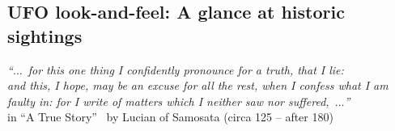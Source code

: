 %
%
%

\begin{partbacktext}
\part{UFO look-and-feel: A glance at historic sightings}
\noindent

\begin{flushright}
{\em ``$\ldots$~for this one thing I confidently pronounce for a truth, that I lie:\\
and this, I hope, may be an excuse for all the rest, when I confess what I am faulty in:
for I write of matters which I neither saw nor suffered,~$\ldots$''} \\
in ``A True Story''~\cite{LucianofSamosata} by Lucian of Samosata (circa 125 -- after 180)
\end{flushright}


\end{partbacktext}
